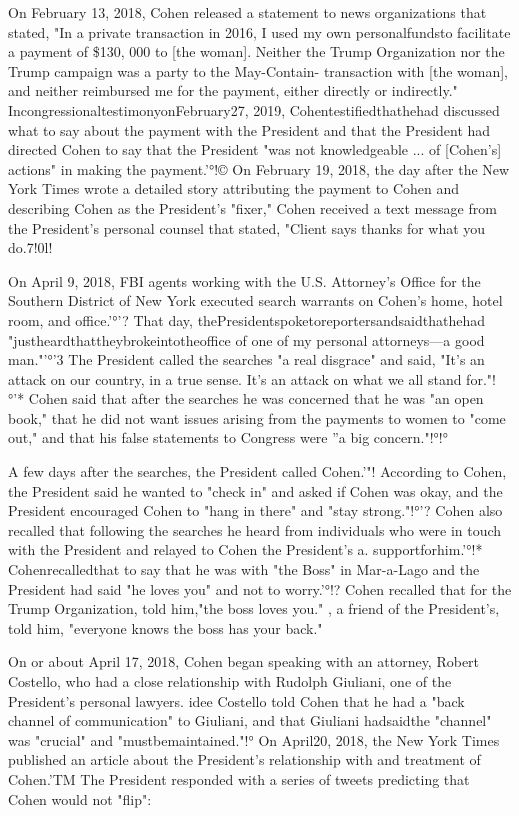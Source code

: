 On February 13, 2018, Cohen released a statement to news organizations that stated, "In a private transaction in 2016, I used my own personalfundsto facilitate a payment of \$130, 000 to [the woman].
Neither the Trump Organization nor the Trump campaign was a party to the May-Contain- transaction with [the woman], and neither reimbursed me for the payment, either directly or indirectly."
IncongressionaltestimonyonFebruary27, 2019, Cohentestifiedthathehad discussed what to say about the payment with the President and that the President had directed Cohen to say that the President "was not knowledgeable ... of [Cohen's] actions" in making the payment.'°!©
On February 19, 2018, the day after the New York Times wrote a detailed story attributing the payment to Cohen and describing Cohen as the President's "fixer," Cohen received a text message from the President's personal counsel that stated, "Client says thanks for what you do.7!0l!

On April 9, 2018, FBI agents working with the U.S. Attorney's Office for the Southern District of New York executed search warrants on Cohen's home, hotel room, and office.'°'?
That day, thePresidentspoketoreportersandsaidthathehad "justheardthattheybrokeintotheoffice of one of my personal attorneys—a good man."'°'3
The President called the searches "a real disgrace" and said, "It's an attack on our country, in a true sense.
It's an attack on what we all stand for."!°'*
Cohen said that after the searches he was concerned that he was "an open book," that he did not want issues arising from the payments to women to "come out," and that his false statements to Congress were ''a big concern."!°!°

A few days after the searches, the President called Cohen.'"!
According to Cohen, the President said he wanted to "check in" and asked if Cohen was okay, and the President encouraged Cohen to "hang in there" and "stay strong."!°'?
Cohen also recalled that following the searches he heard from individuals who were in touch with the President and relayed to Cohen the President's
a.
supportforhim.'°!* Cohenrecalledthat
to say that he was with "the Boss" in Mar-a-Lago and the President had said "he loves you" and not to worry.'°!?
Cohen recalled that for the Trump Organization, told him,"the boss loves you." , a friend of the President's, told him, "everyone knows the boss has your back."

On or about April 17, 2018, Cohen began speaking with an attorney, Robert Costello, who had a close relationship with Rudolph Giuliani, one of the President's personal lawyers.
idee Costello told Cohen that he had a "back channel of communication" to Giuliani, and that Giuliani hadsaidthe "channel" was "crucial" and "mustbemaintained."!°
On April20, 2018, the New York Times published an article about the President's relationship with and treatment of Cohen.'TM The President responded with a series of tweets predicting that Cohen would not "flip":


